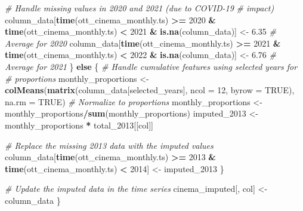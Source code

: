 \documentclass[
]{article}
\newenvironment{Shaded}{\begin{snugshade}}{\end{snugshade}}
\newcommand{\AttributeTok}[1]{\textcolor[rgb]{0.13,0.29,0.53}{#1}}
\newcommand{\CommentTok}[1]{\textcolor[rgb]{0.56,0.35,0.01}{\textit{#1}}}
\newcommand{\ConstantTok}[1]{\textcolor[rgb]{0.56,0.35,0.01}{#1}}
\newcommand{\ControlFlowTok}[1]{\textcolor[rgb]{0.13,0.29,0.53}{\textbf{#1}}}
\newcommand{\DecValTok}[1]{\textcolor[rgb]{0.00,0.00,0.81}{#1}}
\newcommand{\FloatTok}[1]{\textcolor[rgb]{0.00,0.00,0.81}{#1}}
\newcommand{\FunctionTok}[1]{\textcolor[rgb]{0.13,0.29,0.53}{\textbf{#1}}}
\newcommand{\NormalTok}[1]{#1}
\newcommand{\OtherTok}[1]{\textcolor[rgb]{0.56,0.35,0.01}{#1}}
\newcommand{\SpecialCharTok}[1]{\textcolor[rgb]{0.81,0.36,0.00}{\textbf{#1}}}
\begin{document}
\begin{Shaded}
\begin{Highlighting}[]
        \CommentTok{\# Handle missing values in 2020 and 2021 (due to COVID{-}19}
        \CommentTok{\# impact)}
\NormalTok{        column\_data[}\FunctionTok{time}\NormalTok{(ott\_cinema\_monthly.ts) }\SpecialCharTok{\textgreater{}=} \DecValTok{2020} \SpecialCharTok{\&} \FunctionTok{time}\NormalTok{(ott\_cinema\_monthly.ts) }\SpecialCharTok{\textless{}}
            \DecValTok{2021} \SpecialCharTok{\&} \FunctionTok{is.na}\NormalTok{(column\_data)] }\OtherTok{\textless{}{-}} \FloatTok{6.35}  \CommentTok{\# Average for 2020}
\NormalTok{        column\_data[}\FunctionTok{time}\NormalTok{(ott\_cinema\_monthly.ts) }\SpecialCharTok{\textgreater{}=} \DecValTok{2021} \SpecialCharTok{\&} \FunctionTok{time}\NormalTok{(ott\_cinema\_monthly.ts) }\SpecialCharTok{\textless{}}
            \DecValTok{2022} \SpecialCharTok{\&} \FunctionTok{is.na}\NormalTok{(column\_data)] }\OtherTok{\textless{}{-}} \FloatTok{6.76}  \CommentTok{\# Average for 2021}
\NormalTok{    \} }\ControlFlowTok{else}\NormalTok{ \{}
        \CommentTok{\# Handle cumulative features using selected years for}
        \CommentTok{\# proportions}
\NormalTok{        monthly\_proportions }\OtherTok{\textless{}{-}} \FunctionTok{colMeans}\NormalTok{(}\FunctionTok{matrix}\NormalTok{(column\_data[selected\_years],}
            \AttributeTok{ncol =} \DecValTok{12}\NormalTok{, }\AttributeTok{byrow =} \ConstantTok{TRUE}\NormalTok{), }\AttributeTok{na.rm =} \ConstantTok{TRUE}\NormalTok{)}
        \CommentTok{\# Normalize to proportions}
\NormalTok{        monthly\_proportions }\OtherTok{\textless{}{-}}\NormalTok{ monthly\_proportions}\SpecialCharTok{/}\FunctionTok{sum}\NormalTok{(monthly\_proportions)}
\NormalTok{        imputed\_2013 }\OtherTok{\textless{}{-}}\NormalTok{ monthly\_proportions }\SpecialCharTok{*}\NormalTok{ total\_2013[[col]]}

        \CommentTok{\# Replace the missing 2013 data with the imputed values}
\NormalTok{        column\_data[}\FunctionTok{time}\NormalTok{(ott\_cinema\_monthly.ts) }\SpecialCharTok{\textgreater{}=} \DecValTok{2013} \SpecialCharTok{\&} \FunctionTok{time}\NormalTok{(ott\_cinema\_monthly.ts) }\SpecialCharTok{\textless{}}
            \DecValTok{2014}\NormalTok{] }\OtherTok{\textless{}{-}}\NormalTok{ imputed\_2013}
\NormalTok{    \}}

    \CommentTok{\# Update the imputed data in the time series}
\NormalTok{    cinema\_imputed[, col] }\OtherTok{\textless{}{-}}\NormalTok{ column\_data}
\NormalTok{\}}
\end{Highlighting}
\end{Shaded}
\end{document}

